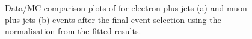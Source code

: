 \begin{figure}[!htbp]
	\centering
  	\hfill
    \caption{Data/MC comparison plots of \MET for electron plus jets (a) and muon plus jets (b) events after the final
    event selection using the normalisation from the fitted results.}
    \label{fig:fitted_MET}
\end{figure}

